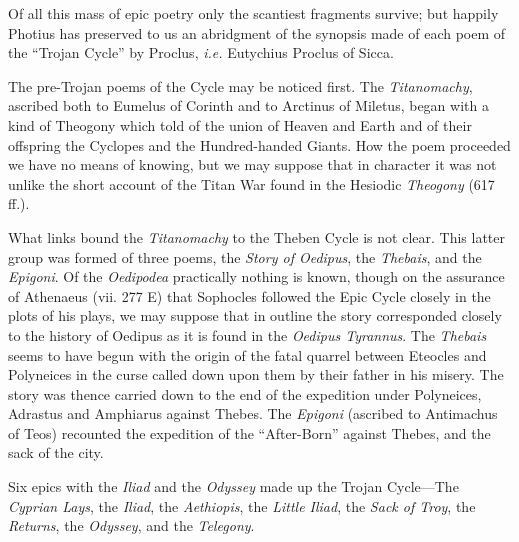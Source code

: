 Of all this mass of epic poetry only the scantiest fragments survive; but
happily Photius has preserved to us an abridgment of the synopsis made of each
poem of the “Trojan Cycle” by Proclus, \emph{i.e.} Eutychius
Proclus of Sicca.

The pre-Trojan poems of the Cycle may be noticed first. The \emph{Titanomachy},
ascribed both to Eumelus of Corinth and to Arctinus of Miletus, began with a
kind of Theogony which told of the union of Heaven and Earth and of their
offspring the Cyclopes and the Hundred-handed Giants. How the poem proceeded we
have no means of knowing, but we may suppose that in character it was not
unlike the short account of the Titan War found in the Hesiodic \emph{Theogony}
(617 ff.).

What links bound the \emph{Titanomachy} to the Theben Cycle is not clear. This
latter group was formed of three poems, the \emph{Story of Oedipus}, the
\emph{Thebais}, and the \emph{Epigoni}. Of the \emph{Oedipodea} practically
nothing is known, though on the assurance of Athenaeus (vii. 277 E) that
Sophocles followed the Epic Cycle closely in the plots of his plays, we may
suppose that in outline the story corresponded closely to the history of
Oedipus as it is found in the \emph{Oedipus Tyrannus}. The \emph{Thebais} seems
to have begun with the origin of the fatal quarrel between Eteocles and
Polyneices in the curse called down upon them by their father in his misery.
The story was thence carried down to the end of the expedition under
Polyneices, Adrastus and Amphiarus against Thebes. The \emph{Epigoni} (ascribed
to Antimachus of Teos) recounted the expedition of the “After-Born”
against Thebes, and the sack of the city.


Six epics with the \emph{Iliad} and the \emph{Odyssey} made up the Trojan
Cycle—The \emph{Cyprian Lays}, the \emph{Iliad}, the \emph{Aethiopis},
the \emph{Little Iliad}, the \emph{Sack of Troy}, the \emph{Returns}, the
\emph{Odyssey}, and the \emph{Telegony}.


